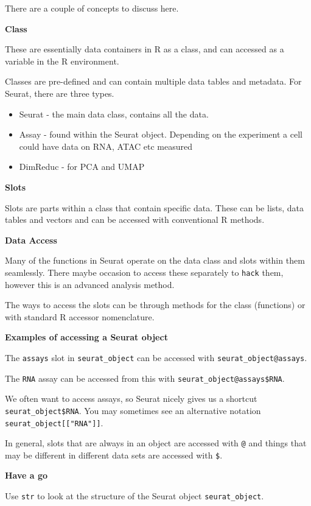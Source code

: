 \documentclass[
]{book}
\providecommand{\tightlist}{%
  \setlength{\itemsep}{0pt}\setlength{\parskip}{0pt}}
\begin{document}
There are a couple of concepts to discuss here.

\textbf{Class}

These are essentially data containers in R as a class, and can accessed as a variable in the R environment.

Classes are pre-defined and can contain multiple data tables and metadata. For Seurat, there are three types.

\begin{itemize}
\tightlist
\item
  Seurat - the main data class, contains all the data.
\item
  Assay - found within the Seurat object. Depending on the experiment a cell could have data on RNA, ATAC etc measured
\item
  DimReduc - for PCA and UMAP
\end{itemize}

\textbf{Slots}

Slots are parts within a class that contain specific data. These can be lists, data tables and vectors and can be accessed with conventional R methods.

\textbf{Data Access}

Many of the functions in Seurat operate on the data class and slots within them seamlessly. There maybe occasion to access these separately to \texttt{hack} them, however this is an advanced analysis method.

The ways to access the slots can be through methods for the class (functions) or with standard R accessor nomenclature.

\textbf{Examples of accessing a Seurat object}

The \texttt{assays} slot in \texttt{seurat\_object} can be accessed with \texttt{seurat\_object@assays}.

The \texttt{RNA} assay can be accessed from this with \texttt{seurat\_object@assays\$RNA}.

We often want to access assays, so Seurat nicely gives us a shortcut \texttt{seurat\_object\$RNA}. You may sometimes see an alternative notation \texttt{seurat\_object{[}{[}"RNA"{]}{]}}.

In general, slots that are always in an object are accessed with \texttt{@} and things that may be different in different data sets are accessed with \texttt{\$}.

\textbf{Have a go}

Use \texttt{str} to look at the structure of the Seurat object \texttt{seurat\_object}.
\end{document}

